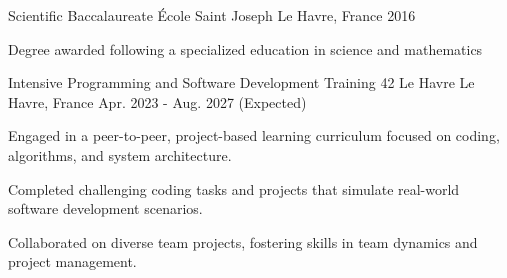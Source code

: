 

\begin{cventries}

\cventry
{Scientific Baccalaureate} %
{École Saint Joseph} %
{Le Havre, France} %
{2016} %
{
\begin{cvitems} %
\item {Degree awarded following a specialized education in science and mathematics}
\end{cvitems}
}
  \cventry
    {Intensive Programming and Software Development Training} %
    {42 Le Havre} %
    {Le Havre, France} %
    {Apr. 2023 - Aug. 2027 (Expected)} %
    {
      \begin{cvitems} %
        \item {Engaged in a peer-to-peer, project-based learning curriculum focused on coding, algorithms, and system architecture.}
        \item {Completed challenging coding tasks and projects that simulate real-world software development scenarios.}
        \item {Collaborated on diverse team projects, fostering skills in team dynamics and project management.}
      \end{cvitems}
    }

\end{cventries}